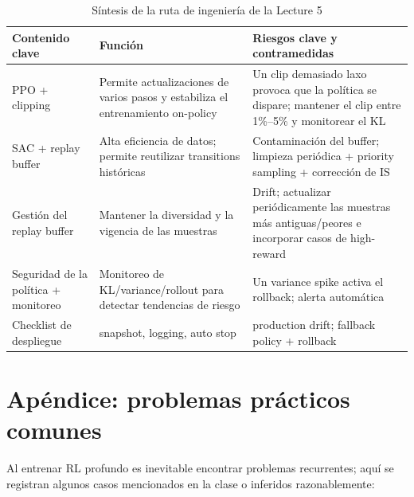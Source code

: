 \documentclass[a4paper]{article}
\begin{document}
\begin{table}[H]
\centering
\begin{tabular}{p{} p{} p{}}
\toprule
Contenido clave & Función & Riesgos clave y contramedidas \\
\midrule
PPO + clipping & Permite actualizaciones de varios pasos y estabiliza el entrenamiento on-policy & Un clip demasiado laxo provoca que la política se dispare; mantener el clip entre 1\%--5\% y monitorear el KL \\
SAC + replay buffer & Alta eficiencia de datos; permite reutilizar transitions históricas & Contaminación del buffer; limpieza periódica + priority sampling + corrección de IS \\
Gestión del replay buffer & Mantener la diversidad y la vigencia de las muestras & Drift; actualizar periódicamente las muestras más antiguas/peores e incorporar casos de high-reward \\
Seguridad de la política + monitoreo & Monitoreo de KL/variance/rollout para detectar tendencias de riesgo & Un variance spike activa el rollback; alerta automática \\
Checklist de despliegue & snapshot, logging, auto stop & production drift; fallback policy + rollback \\
\bottomrule
\end{tabular}
\caption{Síntesis de la ruta de ingeniería de la Lecture 5}
\end{table}

\section{Apéndice: problemas prácticos comunes}

Al entrenar RL profundo es inevitable encontrar problemas recurrentes; aquí se registran algunos casos mencionados en la clase o inferidos razonablemente:
\end{document}
